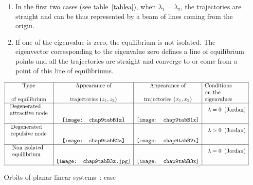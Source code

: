 \begin{remarques}{\hspace{1cm}}\end{remarques}
\begin{enumerate}
\item In the first two cases (see table~\ref{tablea}), when
$\lambda_1=\lambda_2$, the trajectories are straight and can be thus represented by a beam of lines coming from the origin.
\item If one of the eigenvalue is zero, the equilibrium is not isolated. The eigenvector corresponding to the eigenvalue zero defines a line of equilibrium points and all the trajectories are straight and converge to or come from a point of this line of equilibriums.
\end{enumerate}
\begin{table}
\begin{eqnarray*}
\begin{array}{|c|c|c|l|}
\hline
\mbox{Type}&\mbox{Appearance of}& \mbox{Appearance of} &\mbox{Conditions}\\&&& \mbox{on the}\\
\mbox{of equilibrium}&\mbox{trajectories }(z_1,z_2)&\mbox{trajectories }(x_1,x_2)&
\mbox{eigenvalues}\\
\hline
\begin{array}{l}
\mbox{Degenerated}\\
\mbox{attractive node}\end{array} & & &\begin{array}{l} \lambda = 0\\  \end{array} \mbox{(Jordan)} \\
&\mbox{\texttt{[image: chap9tabB1z]}}&\mbox{\texttt{[image: chap9tabB1x]}} &\\
\hline
\begin{array}{l}
\mbox{Degenerated}\\   
\mbox{repulsive node}\end{array} & & & \begin{array}{l}\lambda >0 \\
\end{array}\mbox{(Jordan)}\\
&\mbox{\texttt{[image: chap9tabB2z]}}&\mbox{\texttt{[image: chap9tabB2x]}} &\\
\hline
\begin{array}{l}
\mbox{Non isolated }\\   
\mbox{equilibrium}\end{array} & & & \begin{array}{l}\lambda=0\\
\end{array}\mbox{(Jordan)}\\
&\mbox{\texttt{[image: chap9tabB3z.jpg]}}&\mbox{\texttt{[image: chap9tabB3x]}} &\\
\hline
\end{array}
\end{eqnarray*}
\caption{Orbits of planar linear systems~: case}
\label{tableb}
\end{table}

